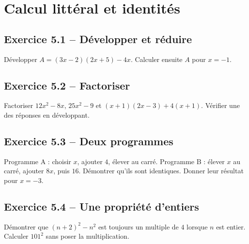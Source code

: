 \chapter{Calcul littéral et identités}
\label{exercices:05}
\section*{Exercice 5.1 -- Développer et réduire}
Développer $A=(3x-2)(2x+5)-4x$. Calculer ensuite $A$ pour $x=-1$.

\section*{Exercice 5.2 -- Factoriser}
Factoriser $12x^2-8x$, $25x^2-9$ et $(x+1)(2x-3)+4(x+1)$. Vérifier une des réponses en développant.

\section*{Exercice 5.3 -- Deux programmes}
Programme A : choisir $x$, ajouter $4$, élever au carré. Programme B : élever $x$ au carré, ajouter $8x$, puis $16$. Démontrer qu'ils sont identiques. Donner leur résultat pour $x=-3$.

\section*{Exercice 5.4 -- Une propriété d'entiers}
Démontrer que $(n+2)^2-n^2$ est toujours un multiple de $4$ lorsque $n$ est entier. Calculer $101^2$ sans poser la multiplication.

